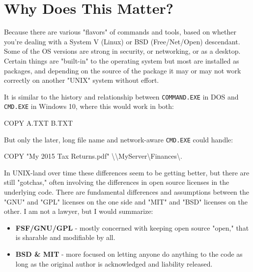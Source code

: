 \documentclass[10pt,american,]{book}
\newenvironment{Shaded}{\begin{snugshade}}{\end{snugshade}}
\newcommand{\KeywordTok}[1]{\textcolor[rgb]{0.13,0.29,0.53}{\textbf{{#1}}}}
\newcommand{\DataTypeTok}[1]{\textcolor[rgb]{0.13,0.29,0.53}{{#1}}}
\newcommand{\StringTok}[1]{\textcolor[rgb]{0.31,0.60,0.02}{{#1}}}
\newcommand{\NormalTok}[1]{{#1}}
\numberwithin{figure}{chapter}
\DeclareRobustCommand{\drshl}[1]{\index{Shells!#1}}
\renewcommand{\KeywordTok}[1]{{#1}}
\renewcommand{\DataTypeTok}[1]{{#1}}
\renewcommand{\StringTok}[1]{{#1}}
\renewcommand{\NormalTok}[1]{{#1}}
\begin{document}
\section*{Why Does This Matter?}\label{why-does-this-matter}

Because there are various "flavors" of commands and tools, based on
whether you're dealing with a System V (Linux) or BSD (Free/Net/Open)
descendant. Some of the OS versions are strong in security, or
networking, or as a desktop. Certain things are "built-in" to the
operating system but most are installed as packages, and depending on
the source of the package it may or may not work correctly on another
"UNIX" system without effort.

It is similar to the history and relationship between
\texttt{COMMAND.EXE}\drshl{COMMAND.EXE} in DOS and
\texttt{CMD.EXE}\drshl{CMD.EXE} in Windows 10, where this would work in
both:

\begin{Shaded}
\begin{Highlighting}[]
\KeywordTok{COPY} \NormalTok{A.TXT B.TXT}
\end{Highlighting}
\end{Shaded}

But only the later, long file name and network-aware \texttt{CMD.EXE}
could handle:

\begin{Shaded}
\begin{Highlighting}[]
\KeywordTok{COPY} \StringTok{"My 2015 Tax Returns.pdf"} \DataTypeTok{\textbackslash{}\textbackslash{}}\NormalTok{MyServer\textbackslash{}Finances\textbackslash{}.}
\end{Highlighting}
\end{Shaded}

In UNIX-land over time these differences seem to be getting better, but
there are still "gotchas," often involving the differences in open
source licenses in the underlying code. There are fundamental
differences and assumptions between the "GNU" and "GPL" licenses on the
one side and "MIT" and "BSD" licenses on the other. I am not a lawyer,
but I would summarize:

\begin{itemize}
\item
  \textbf{FSF/GNU/GPL} - mostly concerned with keeping open source
  "open," that is sharable and modifiable by all.
\item
  \textbf{BSD \& MIT} - more focused on letting anyone do anything to
  the code as long as the original author is acknowledged and liability
  released.
\end{itemize}
\end{document}
